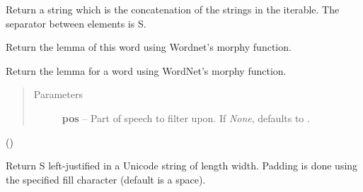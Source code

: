 \documentclass[letterpaper,10pt,english]{sphinxmanual}
\begin{document}
\begin{fulllineitems}

\begin{fulllineitems}
\label{api_reference:textblob_de.blob.Word.join}
Return a string which is the concatenation of the strings in the
iterable.  The separator between elements is S.

\end{fulllineitems}


\begin{fulllineitems}
\label{api_reference:textblob_de.blob.Word.lemma}
Return the lemma of this word using Wordnet's morphy function.

\end{fulllineitems}


\begin{fulllineitems}
\label{api_reference:textblob_de.blob.Word.lemmatize}
Return the lemma for a word using WordNet's morphy function.
\begin{quote}\begin{description}
\item[{Parameters}] \leavevmode
\textbf{pos} -- Part of speech to filter upon. If \emph{None}, defaults to
.

\end{description}\end{quote}

()

\end{fulllineitems}


\begin{fulllineitems}
\label{api_reference:textblob_de.blob.Word.ljust}
Return S left-justified in a Unicode string of length width. Padding is
done using the specified fill character (default is a space).

\end{fulllineitems}


\end{fulllineitems}
\end{document}
